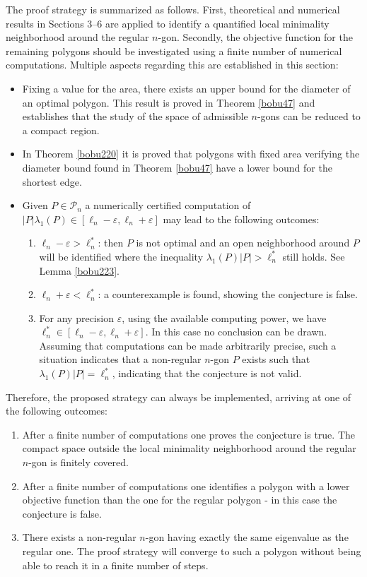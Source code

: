\documentclass[JEP,XML,SOM,Unicode,ThmDefs,NoFloatCountersInSection,published]{cedram}
\newenvironment{enumeratei}
{\bgroup\def\theenumi{\roman{enumi}}\def\theenumii{\arabic{enumii}}\begin{enumerate}}
{\end{enumerate}\egroup}
\newenvironment{enumeratea}
{\bgroup\def\theenumi{\alph{enumi}}\begin{enumerate}}
{\end{enumerate}\egroup}
\let\epsilon\varepsilon
\theoremstyle{plain}
\theoremstyle{definition}
\begin{document}
The proof strategy is summarized as follows. First, theoretical and numerical results in Sections 3--6 are applied to identify a quantified local minimality neighborhood around the regular $n$-gon. Secondly, the objective function for the remaining polygons should be investigated using a finite number of numerical computations. Multiple aspects regarding this are established in this section:
\begin{itemize}
\item Fixing a value for the area, there exists an upper bound for the diameter of an optimal polygon. This result is proved in Theorem \ref{bobu47} and establishes that the study of the space of admissible $n$-gons can be reduced to a compact region.
\item In Theorem \ref{bobu220} it is proved that polygons with fixed area verifying the diameter bound found in Theorem \ref{bobu47} have a lower bound for the shortest edge.
\item Given $P\in \mathcal P_n$ a numerically certified computation of $ |P|\lambda_1(P) \in [\ell_n-\epsilon,\ell_n+\epsilon]$ may lead to the following outcomes:
\begin{enumeratei}
\item
$\ell_n-\epsilon>\ell_n^*$: then $P$ is not optimal and an open neighborhood around $P$ will be identified where the inequality $\lambda_1(P)|P|>\ell_n^*$ still holds. See Lemma \ref{bobu223}.
\item
 $\ell_n+\epsilon<\ell_n^*$: a counterexample is found, showing the conjecture is false.
\item
For any precision $\epsilon$, using the available computing power, we have $\ell_n^* \in [\ell_n-\epsilon,\ell_n+\epsilon]$. In this case no conclusion can be drawn. Assuming that computations can be made arbitrarily precise, such a situation indicates that a non-regular $n$-gon $P$ exists such that $\lambda_1(P)|P|=\ell_n^*$, indicating that the conjecture is not valid.
\end{enumeratei}
\end{itemize}

Therefore, the proposed strategy can always be implemented, arriving at one of the following outcomes:

\begin{enumeratea}
\item
After a finite number of computations one proves the conjecture is true. The compact space outside the local minimality neighborhood around the regular $n$-gon is finitely covered.

\item
After a finite number of computations one identifies a polygon with a lower objective function than the one for the regular polygon - in this case the conjecture is false.

\item
There exists a non-regular $n$-gon having exactly the same eigenvalue as the regular one. The proof strategy will converge to such a polygon without being able to reach it in a finite number of steps.
\end{enumeratea}
\end{document}
